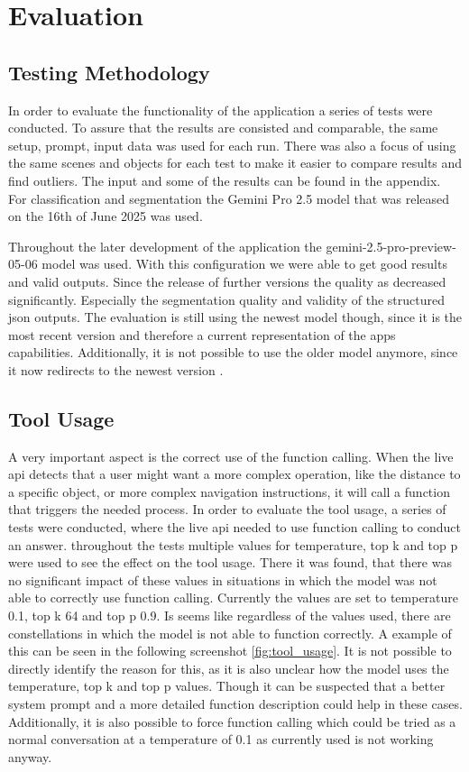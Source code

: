 \section{Evaluation}

\subsection{Testing Methodology}
In order to evaluate the functionality of the application a series of tests were conducted.
To assure that the results are consisted and comparable, the same setup, prompt, input data was used for each run.
There was also a focus of using the same scenes and objects for each test to make it easier to compare results and find outliers.
The input and some of the results can be found in the appendix.
For classification and segmentation the Gemini Pro 2.5 model that was released on the 16th of June 2025 was used.

Throughout the later development of the application the gemini-2.5-pro-preview-05-06 model was used.
With this configuration we were able to get good results and valid outputs.
Since the release of further versions the quality as decreased significantly.
Especially the segmentation quality and validity of the structured json outputs.
The evaluation is still using the newest model though, since it is the most recent version and therefore a current representation of the apps capabilities.
Additionally, it is not possible to use the older model anymore, since it now redirects to the newest version \cite{googleGemini25Pro2025}. 

\subsection{Tool Usage}
A very important aspect is the correct use of the function calling.
When the live api detects that a user might want a more complex operation, like the distance to a specific object, or more complex navigation instructions, it will call a function that triggers the needed process.
In order to evaluate the tool usage, a series of tests were conducted, where the live api needed to use function calling to conduct an answer.
throughout the tests multiple values for temperature, top k and top p were used to see the effect on the tool usage.
There it was found, that there was no significant impact of these values in situations in which the model was not able to correctly use function calling.
Currently the values are set to temperature 0.1, top k 64 and top p 0.9.
Is seems like regardless of the values used, there are constellations in which the model is not able to function correctly.
A example of this can be seen in the following screenshot \ref{fig:tool_usage}.
It is not possible to directly identify the reason for this, as it is also unclear how the model uses the temperature, top k and top p values.
Though it can be suspected that a better system prompt and a more detailed function description could help in these cases.
Additionally, it is also possible to force function calling which could be tried as a normal conversation at a temperature of 0.1 as currently used is not working anyway.

